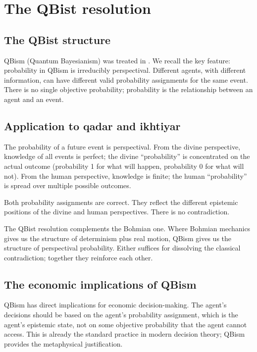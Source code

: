 \section{The QBist resolution}
\label{sec:qad-qbism-resolution}

\subsection{The QBist structure}

QBism (Quantum Bayesianism) was treated in .
We recall the key feature: probability in QBism is irreducibly
perspectival. Different agents, with different information, can
have different valid probability assignments for the same event.
There is no single objective probability; probability is the
relationship between an agent and an event.

\subsection{Application to qadar and ikhtiyar}

\begin{conceptbox}
\label{conc:qbist-qadar}
The probability of a future event is perspectival. From the divine
perspective, knowledge of all events is perfect; the divine
``probability'' is concentrated on the actual outcome
(probability 1 for what will happen, probability 0 for what will
not). From the human perspective, knowledge is finite; the human
``probability'' is spread over multiple possible outcomes.

Both probability assignments are correct. They reflect the
different epistemic positions of the divine and human
perspectives. There is no contradiction.
\end{conceptbox}

The QBist resolution complements the Bohmian one. Where Bohmian
mechanics gives us the structure of determinism plus real motion,
QBism gives us the structure of perspectival probability. Either
suffices for dissolving the classical contradiction; together they
reinforce each other.

\subsection{The economic implications of QBism}

QBism has direct implications for economic decision-making. The
agent's decisions should be based on the agent's probability
assignment, which is the agent's epistemic state, not on some
objective probability that the agent cannot access. This is
already the standard practice in modern decision theory; QBism
provides the metaphysical justification.

